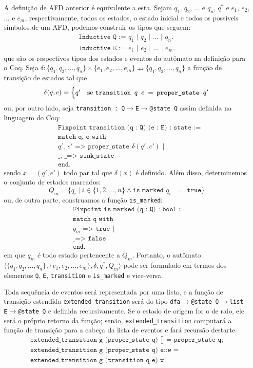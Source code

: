 A definição de AFD anterior é equivalente a esta. Sejam $q_1$, $q_2$, $...$ e $q_n$, $q^*$ e $e_1$, $e_2$, $...$ e $e_m$, respectivamente, todos os estados, o estado inicial e todos os possíveis símbolos de um AFD, podemos construir os tipos que seguem: \begin{gather*}\texttt{Inductive Q := $q_1$ | $q_2$ | $...$ | $q_n$.}\\ \texttt{Inductive E := $e_1$ | $e_2$ | $...$ | $e_m$.}\end{gather*} que são os respectivos tipos dos estados e eventos do autômato na definição para o Coq. Seja $\delta : \{ q_1, q_2, ..., q_n \} \times \{ e_1, e_2, ..., e_m \} \nrightarrow \{ q_1, q_2, ..., q_n \}$ a função de transição de estados tal que $$\delta(q, e) = \begin{cases}
q' & \text{se \texttt{transition $q$ $e$ $=$ proper\_state $q'$}}
\end{cases}$$ ou, por outro lado, seja \texttt{transition : Q$\to$E$\to$@state Q} assim definida na linguagem do Coq: 	\begin{align*}
&\texttt{Fixpoint transition (q : Q) (e : E) : state :=}\\
&\texttt{match q, e with}\\
&\texttt{$q'$, $e'$ => proper\_state $\delta(q', e')$ |}\\
&\texttt{\_, \_ => sink\_state}\\
&\texttt{end.}
\end{align*} sendo $x = (q',e')$ todo par tal que $\delta(x)$ é definido. Além disso, determinemos o conjunto de estados marcados: $$Q_m = \{ q_i \mid i \in \{ 1, 2, ..., n \} \wedge \texttt{is\_marked $q_i$ $=$ true} \}$$ ou, de outra parte, construamos a função \texttt{is\_marked}: \begin{align*}
&\texttt{Fixpoint is\_marked (q : Q) : bool :=}\\
&\texttt{match q with}\\
&\texttt{$q_m$ => true |}\\
&\texttt{\_ => false}\\
&\texttt{end.}
\end{align*} em que $q_m$ é todo estado pertencente a $Q_m$. Portanto, o autômato $\langle \{ q_1, q_2, ..., q_n \}, \{ e_1, e_2, ..., e_m \}, \delta, q^*, Q_m \rangle$ pode ser formulado em termos dos elementos \texttt{Q}, \texttt{E}, \texttt{transition} e \texttt{is\_marked} e vice-versa.

Toda sequência de eventos será representada por uma lista, e a função de transição estendida \texttt{extended\_transition} será do tipo \texttt{dfa$\to$@state Q$\to$list E$\to$@state Q} e definida recursivamente. Se o estado de origem for o de ralo, ele será o próprio retorno da função; senão, \texttt{extended\_transition} computará a função de transição para a cabeça da lista de eventos e fará recursão destarte: \begin{gather*}
\texttt{extended\_transition g (proper\_state q) [] = proper\_state q;}\\\texttt{extended\_transition g (proper\_state q) e::w =}\\\texttt{extended\_transition g (transition q e) w}\end{gather*}

